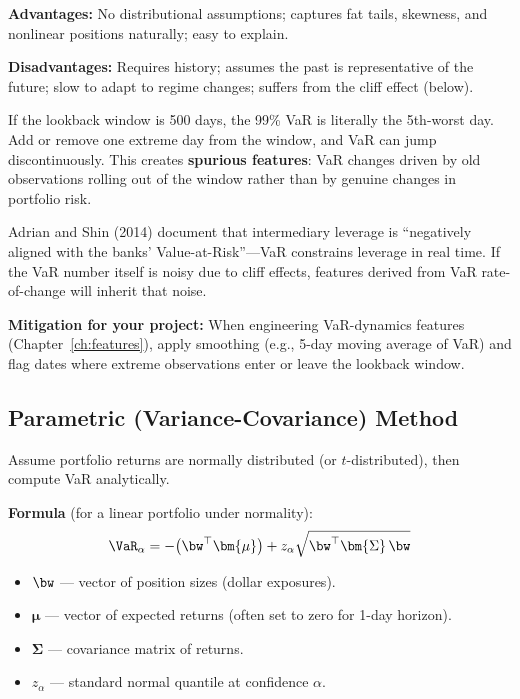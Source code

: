 \textbf{Advantages:} No distributional assumptions; captures fat tails,
skewness, and nonlinear positions naturally; easy to explain.

\textbf{Disadvantages:} Requires history; assumes the past is representative
of the future; slow to adapt to regime changes; suffers from the cliff
effect (below).

\begin{warning}
If the lookback window is 500 days, the 99\% VaR is literally the
5th-worst day.  Add or remove one extreme day from the window, and VaR
can jump discontinuously.  This creates \textbf{spurious features}:
VaR changes driven by old observations rolling out of the window rather
than by genuine changes in portfolio risk.

Adrian and Shin (2014) document that intermediary leverage is ``negatively
aligned with the banks' Value-at-Risk''---VaR constrains leverage in
real time.  If the VaR number itself is noisy due to cliff effects,
features derived from VaR rate-of-change will inherit that noise.

\textbf{Mitigation for your project:} When engineering VaR-dynamics
features (Chapter~\ref{ch:features}), apply smoothing (e.g., 5-day
moving average of VaR) and flag dates where extreme observations enter
or leave the lookback window.
\end{warning}

\subsection{Parametric (Variance-Covariance) Method}
\label{subsec:parametric}

Assume portfolio returns are normally distributed (or $t$-distributed),
then compute VaR analytically.

\textbf{Formula} (for a linear portfolio under normality):
\begin{equation}
\label{eq:parametric-var}
\VaR_\alpha = -\bigl(\bw^\top \bm{\mu}\bigr)
  + z_\alpha \sqrt{\bw^\top \bm{\Sigma}\, \bw}
\end{equation}
\begin{itemize}[nosep]
  \item $\bw$ --- vector of position sizes (dollar exposures).
  \item $\bm{\mu}$ --- vector of expected returns (often set to zero for
        1-day horizon).
  \item $\bm{\Sigma}$ --- covariance matrix of returns.
  \item $z_\alpha$ --- standard normal quantile at confidence $\alpha$.
\end{itemize}

